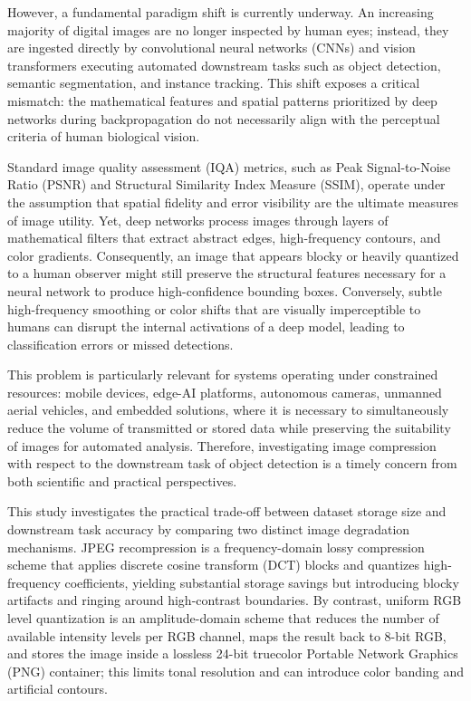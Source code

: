 \documentclass[12pt, a4paper]{article}
\begin{document}
However, a fundamental paradigm shift is currently underway. An increasing majority of digital images are no longer inspected by human eyes; instead, they are ingested directly by convolutional neural networks (CNNs) and vision transformers executing automated downstream tasks such as object detection, semantic segmentation, and instance tracking. This shift exposes a critical mismatch: the mathematical features and spatial patterns prioritized by deep networks during backpropagation do not necessarily align with the perceptual criteria of human biological vision.

Standard image quality assessment (IQA) metrics, such as Peak Signal-to-Noise Ratio (PSNR) and Structural Similarity Index Measure (SSIM), operate under the assumption that spatial fidelity and error visibility are the ultimate measures of image utility. Yet, deep networks process images through layers of mathematical filters that extract abstract edges, high-frequency contours, and color gradients. Consequently, an image that appears blocky or heavily quantized to a human observer might still preserve the structural features necessary for a neural network to produce high-confidence bounding boxes. Conversely, subtle high-frequency smoothing or color shifts that are visually imperceptible to humans can disrupt the internal activations of a deep model, leading to classification errors or missed detections.

This problem is particularly relevant for systems operating under constrained resources: mobile devices, edge-AI platforms, autonomous cameras, unmanned aerial vehicles, and embedded solutions, where it is necessary to simultaneously reduce the volume of transmitted or stored data while preserving the suitability of images for automated analysis. Therefore, investigating image compression with respect to the downstream task of object detection is a timely concern from both scientific and practical perspectives.

This study investigates the practical trade-off between dataset storage size and downstream task accuracy by comparing two distinct image degradation mechanisms. JPEG recompression is a frequency-domain lossy compression scheme that applies discrete cosine transform (DCT) blocks and quantizes high-frequency coefficients, yielding substantial storage savings but introducing blocky artifacts and ringing around high-contrast boundaries. By contrast, uniform RGB level quantization is an amplitude-domain scheme that reduces the number of available intensity levels per RGB channel, maps the result back to 8-bit RGB, and stores the image inside a lossless 24-bit truecolor Portable Network Graphics (PNG) container; this limits tonal resolution and can introduce color banding and artificial contours.
\end{document}
